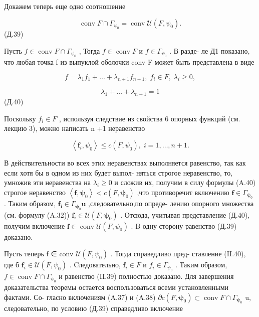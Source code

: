 \documentclass[8pt]{extarticle}
\begin{document}
Докажем теперь еще одно соотношение

\[
\operatorname{conv}F \cap  {\Gamma }_{{\psi }_{0}} = \operatorname{conv}\mathcal{U}\left( {F,{\psi }_{0}}\right) .
\]
 (Д.39)

Пусть \(f \in  \operatorname{conv}F \cap  {\Gamma }_{{\psi }_{0}}\) , Тогда \(f \in  \operatorname{conv}F\) и \(f \in  {\Gamma }_{{\psi }_{0}}\) . В разде- ле Д1 показано, что любая точка f из выпуклой оболочки conv F может быть представлена в виде

\[
f = {\lambda }_{1}{f}_{1} + \ldots  + {\lambda }_{n + 1}{f}_{n + 1},\;{f}_{i} \in  F,\;{\lambda }_{i} \geq  0,
\]

\[
{\lambda }_{1} + \ldots  + {\lambda }_{n + 1} = 1
\]
 (Д.40)

Поскольку \({f}_{i} \in  F\) , используя следствие из свойства 6 опорных функций (см. лекцию 3), можно написать n +1 неравенство

\[
\left\langle  {{\mathbf{f}}_{i},{\psi }_{0}}\right\rangle   \leq  c\left( {F,{\psi }_{0}}\right) ,\;i = 1,\ldots ,n + 1.
\]

В действительности во всех этих неравенствах выполняется равенство, так как если хотя бы в одном из них будет выпол- няться строгое неравенство, то, умножив эти неравенства на \({\lambda }_{i} \geq  0\) и сложив их, получим в силу формулы (A.40) строгое неравенство \(\left\langle  {\mathbf{f},{\mathbf{\psi }}_{0}}\right\rangle   < c\left( {F,{\mathbf{\psi }}_{0}}\right)\) ,что противоречит включению \(\mathbf{f} \in  {\Gamma }_{{\mathbf{\psi }}_{0}}\) . Таким образом, \({\mathbf{f}}_{\mathbf{i}} \in  {\Gamma }_{{\mathbf{\psi }}_{0}}\mathbf{u}\) ,следовательно,по опреде- лению опорного множества (см. формулу (A.32)) \({\mathbf{f}}_{i} \in  \mathcal{U}\left( {F,{\mathbf{\psi }}_{0}}\right)\) . Отсюда, учитывая представление (Д.40), получим включение \(\mathbf{f} \in  \operatorname{conv}\mathcal{U}\left( {F,{\psi }_{0}}\right)\) . B одну сторону равенство (Д.39) доказано.

Пусть теперь f ∈ conv \(\mathcal{U}\left( {F,{\psi }_{0}}\right)\) . Тогда справедливо пред- ставление (II.40), где б \({\mathbf{f}}_{i} \in  \mathcal{U}\left( {F,{\psi }_{0}}\right)\) . Cледовательно, \({\mathbf{f}}_{i} \in  F\) и \({f}_{i} \in  {\Gamma }_{{\psi }_{0}}\) . Таким образом, \(f \in  \operatorname{conv}F \cap  {\Gamma }_{{\psi }_{0}}\) и равенство (II.39) полностью доказано. Для завершения доказательства теоремы остается воспользоваться всеми установленными фактами. Со- гласно включениям (A.37) и (A.38) \(\partial c\left( {F,{\mathbf{\psi }}_{0}}\right)  \subset  \operatorname{conv}F \cap  {\Gamma }_{{\mathbf{\psi }}_{0}}\) u, следовательно, по условию (Д.39) справедливо включение
\end{document}
